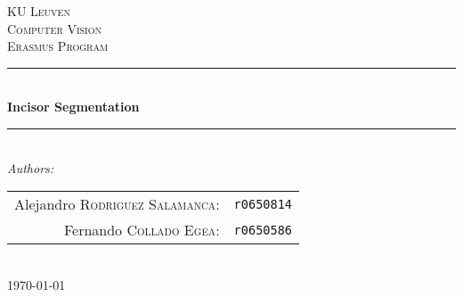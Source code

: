 \begin{titlepage}

\newcommand{\HRule}{\rule{\linewidth}{0.5mm}} %

\center %


\textsc{\LARGE KU Leuven}\\[3.5cm] %
\textsc{\Large Computer Vision}\\[0.5cm] %
\textsc{\large Erasmus Program}\\[2.5cm] %


\HRule \\[0.4cm]
{ \huge \bfseries Incisor Segmentation}\\[0.4cm] %
\HRule \\[5.5cm]



\emph{Authors:}\\[0.7cm]

\begin{tabular}{rl}
    Alejandro \textsc{Rodriguez Salamanca}: &\texttt{r0650814}\\
    Fernando \textsc{Collado Egea}: &\texttt{r0650586}\\

\end{tabular}\\[2cm]



{\large \today}\\[3cm] %


\end{titlepage}
